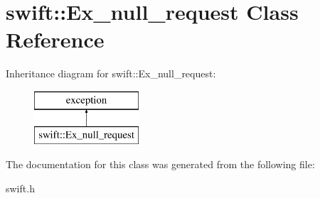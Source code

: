 \hypertarget{classswift_1_1_ex__null__request}{\section{swift\-:\-:Ex\-\_\-null\-\_\-request Class Reference}
\label{classswift_1_1_ex__null__request}
}
Inheritance diagram for swift\-:\-:Ex\-\_\-null\-\_\-request\-:\begin{figure}[H]
\begin{center}
\leavevmode
\includegraphics[height=2.000000cm]{classswift_1_1_ex__null__request}
\end{center}
\end{figure}


The documentation for this class was generated from the following file\-:\begin{DoxyCompactItemize}
\item 
swift.\-h\end{DoxyCompactItemize}
